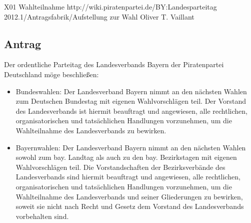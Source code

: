 \sonstigerantrag
{X01}
{Wahlteilnahme}
{http://wiki.piratenpartei.de/BY:Landesparteitag 2012.1/Antragsfabrik/Aufstellung zur Wahl}
{Oliver T. Vaillant}

\subsection{Antrag}
Der ordentliche Parteitag des Landesverbands Bayern der Piratenpartei Deutschland möge
beschließen:
\begin{itemize}
	\item Bundeswahlen: Der Landesverband Bayern nimmt an den nächsten Wahlen zum Deutschen Bundestag mit eigenen Wahlvorschlägen teil. Der Vorstand des Landesverbands ist hiermit beauftragt und angewiesen, alle rechtlichen, organisatorischen und tatsächlichen Handlungen vorzunehmen, um die Wahlteilnahme des Landesverbands zu bewirken.
	\item Bayernwahlen: Der Landesverband Bayern nimmt an den nächsten Wahlen sowohl zum bay. Landtag als auch zu den bay. Bezirkstagen mit eigenen Wahlvorschlägen teil. Die Vorstandschaften der Bezirksverbände des Landesverbands sind hiermit beauftragt und angewiesen, alle rechtlichen, organisatorischen und tatsächlichen Handlungen vorzunehmen, um die Wahlteilnahme des Landesverbands und seiner Gliederungen zu bewirken, soweit sie nicht nach Recht und Gesetz dem Vorstand des Landesverbands vorbehalten sind.
\end{itemize}

